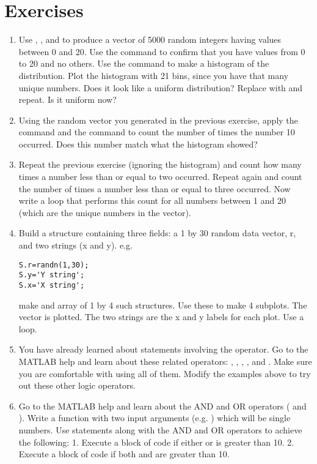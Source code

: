 \documentclass{article}
\begin{document}
\section*{Exercises}
\begin{enumerate}

\item Use , , and \mcode{*} to produce a vector of 5000 random integers having values between 0 and 20. 
Use the  command to confirm that you have values from 0 to 20 and no others. Use the  command to make a histogram of the distribution. Plot the histogram with 21 bins, since you have that many unique numbers. Does it look like a uniform distribution? Replace  with  and repeat. Is it uniform now? 

\item Using the random vector you generated in the previous exercise, apply the  command and the  command to count the number of times the number 10 occurred. Does this number match what the histogram showed?

\item Repeat the previous exercise (ignoring the histogram) and count how many times a number less than or equal to two occurred. Repeat again and count the number of times a number less than or equal to three occurred. Now write a  loop that performs this count for all numbers between 1 and 20 (which are the unique numbers in the vector).

\item Build a structure containing three fields: a 1 by 30 random data vector, r, and two strings (x and y).  e.g.
\begin{lstlisting}
S.r=randn(1,30);
S.y='Y string';
S.x='X string';
\end{lstlisting}


make and array of 1 by 4 such structures. Use these to make 4 subplots. The vector is plotted. The two strings are the x and y labels for each plot. Use a loop.

\item You have already learned about  statements involving the \mcode{==} operator. Go to the MATLAB help and learn about these related operators: \mcode{<}, \mcode{>}, \mcode{!=}, \mcode{>=}, and \mcode{<=}. Make sure you are comfortable with using all of them. Modify the  examples above to try out these other logic operators. 

\item Go to the MATLAB help and learn about the AND and OR operators (\mcode{&} and \mcode{\|}). Write a function with two input arguments (e.g. ) which will be single numbers. Use  statements along with the AND and OR operators to achieve the following: 1. Execute a block of code if either  or  is greater than 10.  2. Execute a block of code if both  and  are greater than 10. 


\end{enumerate}
\end{document}
